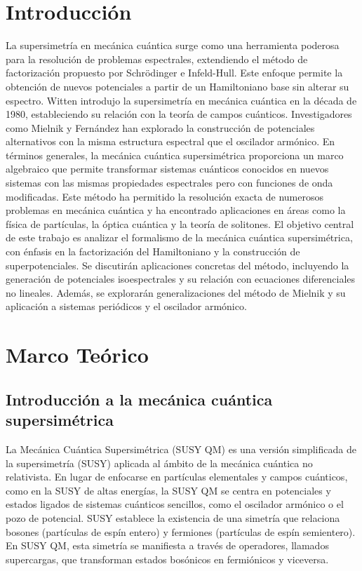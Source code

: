 \documentclass[%
 aip,
 jmp,%
 amsmath,amssymb,
 reprint,
]{revtex4-2}
\begin{document}
\section{Introducción}
La supersimetría en mecánica cuántica surge como una herramienta poderosa para la resolución de problemas espectrales, extendiendo el método de factorización propuesto por Schrödinger e Infeld-Hull. Este enfoque permite la obtención de nuevos potenciales a partir de un Hamiltoniano base sin alterar su espectro. Witten introdujo la supersimetría en mecánica cuántica en la década de 1980, estableciendo su relación con la teoría de campos cuánticos. Investigadores como Mielnik y Fernández han explorado la construcción de potenciales alternativos con la misma estructura espectral que el oscilador armónico.
En términos generales, la mecánica cuántica supersimétrica proporciona un marco algebraico que permite transformar sistemas cuánticos conocidos en nuevos sistemas con las mismas propiedades espectrales pero con funciones de onda modificadas. Este método ha permitido la resolución exacta de numerosos problemas en mecánica cuántica y ha encontrado aplicaciones en áreas como la física de partículas, la óptica cuántica y la teoría de solitones.
El objetivo central de este trabajo es analizar el formalismo de la mecánica cuántica supersimétrica, con énfasis en la factorización del Hamiltoniano y la construcción de superpotenciales. Se discutirán aplicaciones concretas del método, incluyendo la generación de potenciales isoespectrales y su relación con ecuaciones diferenciales no lineales. Además, se explorarán generalizaciones del método de Mielnik y su aplicación a sistemas periódicos y el oscilador armónico.
\section{Marco Teórico}
\subsection{Introducción a la mecánica cuántica supersimétrica}
La Mecánica Cuántica Supersimétrica (SUSY QM) es una versión simplificada de la supersimetría (SUSY) aplicada al ámbito de la mecánica cuántica no relativista. En lugar de enfocarse en partículas elementales y campos cuánticos, como en la SUSY de altas energías, la SUSY QM se centra en potenciales y estados ligados de sistemas cuánticos sencillos, como el oscilador armónico o el pozo de potencial.
SUSY establece la existencia de una simetría que relaciona bosones (partículas de espín entero) y fermiones (partículas de espín semientero). En SUSY QM, esta simetría se manifiesta a través de operadores, llamados supercargas, que transforman estados bosónicos en fermiónicos y viceversa.
\end{document}
